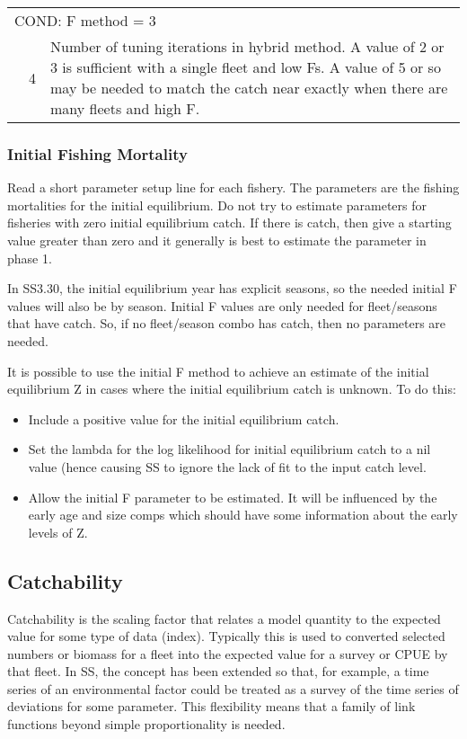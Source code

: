 \begin{longtable}{p{1cm} p{3cm} p{11cm}}
   \multicolumn{3}{l}{COND: F method = 3}\Tstrut\\
   & 4 & Number of tuning iterations in hybrid method. A value of 2 or 3 is sufficient with a single fleet and low Fs.  A value of 5 or so may be needed to match the catch near exactly when there are many fleets and high F. \Bstrut\\
   \hline
\end{longtable}

\subsubsection{Initial Fishing Mortality}
Read a short parameter setup line for each fishery.  The parameters are the fishing mortalities for the initial equilibrium.  Do not try to estimate parameters for fisheries with zero initial equilibrium catch.  If there is catch, then give a starting value greater than zero and it generally is best to estimate the parameter in phase 1.

In SS3.30, the initial equilibrium year has explicit seasons, so the needed initial F values will also be by season.  Initial F values are only needed for fleet/seasons that have catch.  So, if no fleet/season combo has catch, then no parameters are needed.

It is possible to use the initial F method to achieve an estimate of the initial equilibrium Z in cases where the initial equilibrium catch is unknown.  To do this:
\begin{itemize}
	\item Include a positive value for the initial equilibrium catch.
	\item Set the lambda for the log likelihood for initial equilibrium catch to a nil value (hence causing SS to ignore the lack of fit to the input catch level.
	\item Allow the initial F parameter to be estimated.  It will be influenced by the early age and size comps which should have some information about the early levels of Z.
\end{itemize}

\hypertarget{Qsetup}{}
\subsection{Catchability}
Catchability is the scaling factor that relates a model quantity to the expected value for some type of data (index).  Typically this is used to converted selected numbers or biomass for a fleet into the expected value for a survey or CPUE by that fleet.  In SS, the concept has been extended so that, for example, a time series of an environmental factor could be treated as a survey of the time series of deviations for some parameter.  This flexibility means that a family of link functions beyond simple proportionality is needed.

